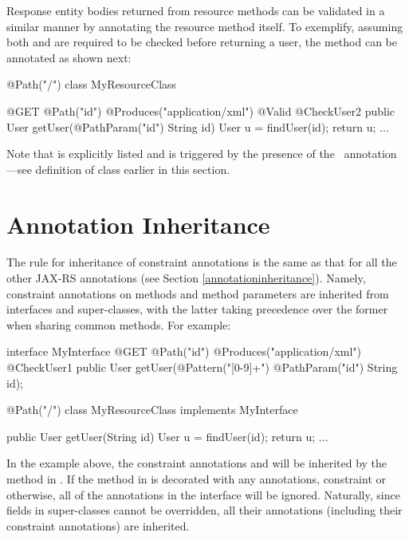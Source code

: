 Response entity bodies returned from resource methods can be validated in a similar manner by annotating the resource method itself. To exemplify, assuming both  and  are required to be checked before returning a user, the  method can be annotated as shown next:

\begin{listing}{1}
@Path("/")
class MyResourceClass {

  @GET
  @Path("{id}")
  @Produces("application/xml")
  @Valid @CheckUser2
  public User getUser(@PathParam("id") String id) {
    User u = findUser(id);
    return u;
  }
  ...
}
\end{listing}

Note that  is explicitly listed and  is triggered by the presence of the \Valid\ annotation ---see definition of  class earlier in this section.

\section{Annotation Inheritance}

The rule for inheritance of constraint annotations is the same as that for all the other JAX-RS annotations (see Section \ref{annotationinheritance}). Namely, constraint annotations on methods and method parameters are inherited from interfaces and super-classes, with the latter taking precedence over the former when sharing common methods. For example:

\begin{listing}{1}
interface MyInterface {
  @GET
  @Path("{id}")
  @Produces("application/xml")
  @CheckUser1
  public User getUser(@Pattern("[0-9]+") @PathParam("id") String id);
}

@Path("/")
class MyResourceClass implements MyInterface {

  public User getUser(String id) {
    User u = findUser(id);
    return u;
  }
  ...
}
\end{listing}

In the example above, the constraint annotations  and  will be inherited by the  method in . If the  method in  is decorated with any annotations, constraint or otherwise, all of the annotations in the interface  will be ignored. Naturally, since fields in super-classes cannot be overridden, all their annotations (including their constraint annotations) are inherited.


